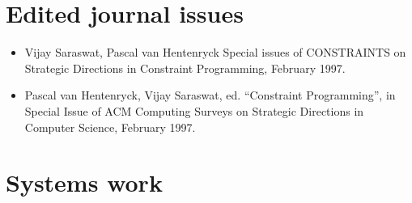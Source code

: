 \documentclass{article}
\begin{document}
\section*{Edited journal issues}
\begin{itemize}
\item  Vijay Saraswat, Pascal van Hentenryck Special issues of
  CONSTRAINTS on Strategic Directions in Constraint Programming,
  February 1997.

\item  Pascal van Hentenryck, Vijay Saraswat, ed. ``Constraint
  Programming'', in Special Issue of ACM Computing Surveys on
  Strategic Directions in Computer Science, February 1997.
\end{itemize}

\section*{Systems work}
\end{document}
